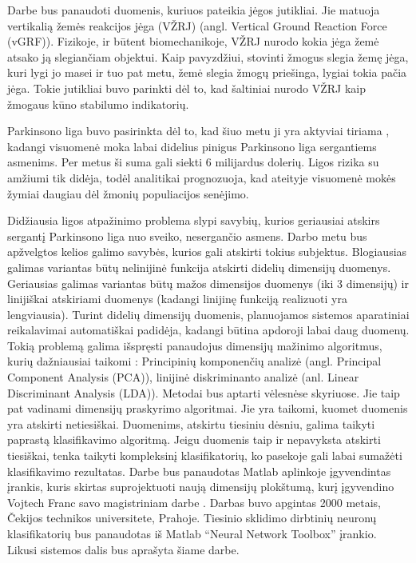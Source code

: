 \documentclass[]{vgtuef}
\begin{document}
Darbe bus panaudoti duomenis, kuriuos pateikia jėgos jutikliai. Jie matuoja vertikalią žemės reakcijos jėga (VŽRJ) (angl. Vertical Ground Reaction Force (vGRF)). Fizikoje, ir būtent biomechanikoje, VŽRJ nurodo kokia jėga žemė atsako ją slegiančiam objektui. Kaip pavyzdžiui, stovinti žmogus slegia žemę jėga, kuri lygi jo masei ir tuo pat metu, žemė slegia žmogų priešinga, lygiai tokia pačia jėga. Tokie jutikliai buvo parinkti dėl to, kad šaltiniai \cite{S0966-6362(05)00058-5} nurodo VŽRJ kaip žmogaus kūno stabilumo indikatorių.

Parkinsono liga buvo pasirinkta dėl to, kad šiuo metu ji yra aktyviai tiriama \cite{vgtu}, kadangi visuomenė moka labai didelius pinigus Parkinsono liga sergantiems asmenims. Per metus ši suma gali siekti 6 milijardus dolerių. Ligos rizika su amžiumi tik didėja, todėl analitikai prognozuoja, kad ateityje visuomenė mokės žymiai daugiau dėl žmonių populiacijos senėjimo.

Didžiausia ligos atpažinimo problema slypi savybių, kurios geriausiai atskirs sergantį Parkinsono liga nuo sveiko, nesergančio asmens. Darbo metu bus apžvelgtos kelios galimo savybės, kurios gali atskirti tokius subjektus. Blogiausias galimas variantas būtų nelinijinė funkcija atskirti didelių dimensijų duomenys. Geriausias galimas variantas būtų mažos dimensijos duomenys (iki 3 dimensijų) ir linijiškai atskiriami duomenys (kadangi linijinę funkciją realizuoti yra lengviausia). Turint didelių dimensijų duomenis, planuojamos sistemos aparatiniai reikalavimai automatiškai padidėja, kadangi būtina apdoroji labai daug duomenų. Tokią problemą galima išspręsti panaudojus dimensijų mažinimo algoritmus, kurių dažniausiai taikomi \cite{824819}: Principinių komponenčių analizė (angl. Principal Component Analysis (PCA)), linijinė diskriminanto analizė (anl. Linear Discriminant Analysis (LDA)). Metodai bus aptarti vėlesnėse skyriuose. Jie taip pat vadinami dimensijų praskyrimo algoritmai. Jie yra taikomi, kuomet duomenis yra atskirti netiesiškai. Duomenims, atskirtu tiesiniu dėsniu, galima taikyti paprastą klasifikavimo algoritmą. Jeigu duomenis taip ir nepavyksta atskirti tiesiškai, tenka taikyti kompleksinį klasifikatorių, ko pasekoje gali labai sumažėti klasifikavimo rezultatas. Darbe bus panaudotas Matlab aplinkoje įgyvendintas įrankis, kuris skirtas suprojektuoti naują dimensijų plokštumą, kurį įgyvendino Vojtech Franc savo magistriniam darbe \cite{stprtool}. Darbas buvo apgintas 2000 metais, Čekijos technikos universitete, Prahoje. Tiesinio sklidimo dirbtinių neuronų klasifikatorių bus panaudotas iš Matlab ``Neural Network Toolbox'' įrankio. Likusi sistemos dalis bus aprašyta šiame darbe.
\end{document}
